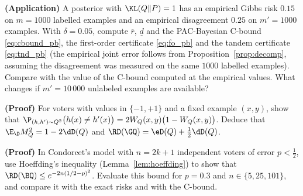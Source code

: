 \begin{exercises}
\begin{exercise}
\textbf{(Application)} A posterior with $\KL(Q\|P)=1$ has an empirical Gibbs risk $0.15$ on
$m=1000$ labelled examples and an empirical disagreement $0.25$ on $m'=1000$ examples.
With $\delta=0.05$, compute $\overline r$, $\underline d$ and the PAC-Bayesian C-bound
\eqref{eq:cbound_pb}, the first-order certificate \eqref{eq:fo_pb} and the tandem
certificate \eqref{eq:tnd_pb} (the empirical joint error follows from
Proposition~\ref{prop:decomp}, assuming the disagreement was measured on the same
$1000$ labelled examples). Compare with the value of the C-bound computed at the empirical
values. What changes if $m'=10\,000$ unlabeled examples are available?
\end{exercise}
\begin{exercise}
\textbf{(Proof)} For voters with values in $\{-1,+1\}$ and a fixed example $(x,y)$, show that
$\P_{(h,h')\sim Q^2}\big(h(x)\neq h'(x)\big)=2W_Q(x,y)\big(1-W_Q(x,y)\big)$. Deduce that
$\E_\D M_Q^2=1-2\dD(Q)$ and $\RD(\GQ)=\eD(Q)+\frac12\dD(Q)$.
\end{exercise}
\begin{exercise}
\textbf{(Proof)} In Condorcet's model with $n=2k+1$ independent voters of error $p<\frac12$,
use Hoeffding's inequality (Lemma~\ref{lem:hoeffding}) to show that
$\RD(\BQ)\leq e^{-2n(1/2-p)^2}$. Evaluate this bound for $p=0.3$ and $n\in\{5,25,101\}$, and compare
it with the exact risks and with the C-bound.
\end{exercise}
\end{exercises}
